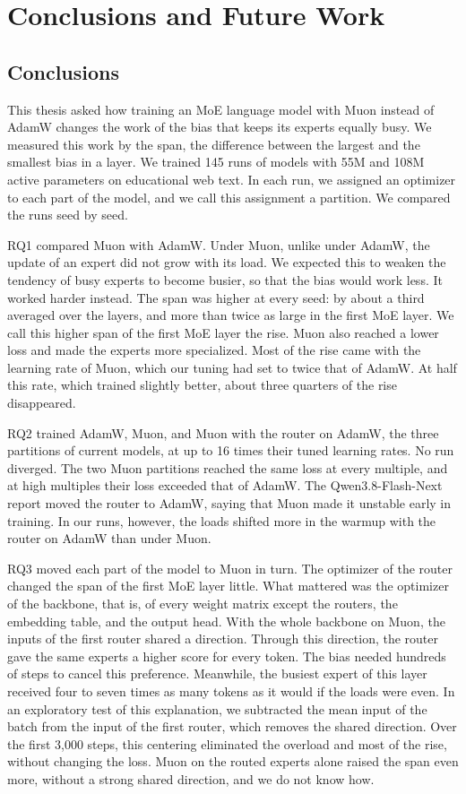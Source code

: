 \chapter{Conclusions and Future Work}
\label{sec:conclusions}

\section{Conclusions}
\label{sec:conclusions-conclusions}
This thesis asked how training an MoE language model with Muon instead of AdamW changes the work of the bias that keeps its experts equally busy. We measured this work by the span, the difference between the largest and the smallest bias in a layer. We trained 145 runs of models with 55M and 108M active parameters on educational web text. In each run, we assigned an optimizer to each part of the model, and we call this assignment a partition. We compared the runs seed by seed.

RQ1 compared Muon with AdamW\@. Under Muon, unlike under AdamW, the update of an expert did not grow with its load. We expected this to weaken the tendency of busy experts to become busier, so that the bias would work less. It worked harder instead. The span was higher at every seed: by about a third averaged over the layers, and more than twice as large in the first MoE layer. We call this higher span of the first MoE layer the rise. Muon also reached a lower loss and made the experts more specialized. Most of the rise came with the learning rate of Muon, which our tuning had set to twice that of AdamW\@. At half this rate, which trained slightly better, about three quarters of the rise disappeared.

RQ2 trained AdamW, Muon, and Muon with the router on AdamW, the three partitions of current models, at up to 16 times their tuned learning rates. No run diverged. The two Muon partitions reached the same loss at every multiple, and at high multiples their loss exceeded that of AdamW\@. The Qwen3.8-Flash-Next report moved the router to AdamW, saying that Muon made it unstable early in training. In our runs, however, the loads shifted more in the warmup with the router on AdamW than under Muon.

RQ3 moved each part of the model to Muon in turn. The optimizer of the router changed the span of the first MoE layer little. What mattered was the optimizer of the backbone, that is, of every weight matrix except the routers, the embedding table, and the output head. With the whole backbone on Muon, the inputs of the first router shared a direction. Through this direction, the router gave the same experts a higher score for every token. The bias needed hundreds of steps to cancel this preference. Meanwhile, the busiest expert of this layer received four to seven times as many tokens as it would if the loads were even. In an exploratory test of this explanation, we subtracted the mean input of the batch from the input of the first router, which removes the shared direction. Over the first 3,000 steps, this centering eliminated the overload and most of the rise, without changing the loss. Muon on the routed experts alone raised the span even more, without a strong shared direction, and we do not know how.

